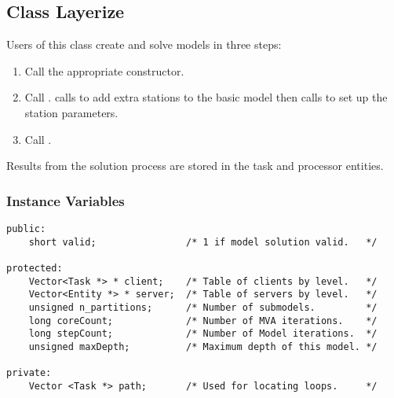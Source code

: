 \begin{figure}[htbp]
  \label{fig:layerize}
  \begin{center}
  \end{center}
\end{figure}

\htmlrule
\subsection{Class Layerize}

Users of this class create and solve models in three steps:
\begin{enumerate}
\item Call the appropriate constructor.
\item Call .
   calls
   to add extra stations
  to the basic model then calls
   to set up the
  station parameters.
\item Call .
\end{enumerate}
Results from the solution process are stored in the task and processor
entities. 

\subsubsection{Instance Variables}
\label{sec:layerize-ivars}

\begin{verbatim}
public:
    short valid;                /* 1 if model solution valid.   */

protected:
    Vector<Task *> * client;    /* Table of clients by level.   */
    Vector<Entity *> * server;  /* Table of servers by level.   */
    unsigned n_partitions;      /* Number of submodels.         */
    long coreCount;             /* Number of MVA iterations.    */
    long stepCount;             /* Number of Model iterations.  */
    unsigned maxDepth;          /* Maximum depth of this model. */

private:
    Vector <Task *> path;       /* Used for locating loops.     */
\end{verbatim}

